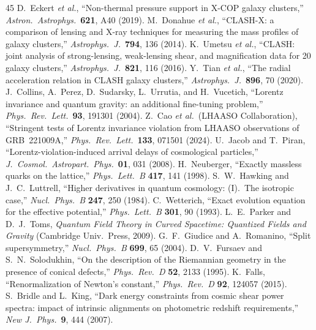 \documentclass[11pt,a4paper]{article}
\begin{document}
\begin{thebibliography}{45}
 D.~Eckert \textit{et al.}, ``Non-thermal pressure support in X-COP galaxy clusters,'' \textit{Astron.\ Astrophys.}\ \textbf{621}, A40 (2019).
 M.~Donahue \textit{et al.}, ``CLASH-X: a comparison of lensing and X-ray techniques for measuring the mass profiles of galaxy clusters,'' \textit{Astrophys.\ J.}\ \textbf{794}, 136 (2014).
 K.~Umetsu \textit{et al.}, ``CLASH: joint analysis of strong-lensing, weak-lensing shear, and magnification data for 20 galaxy clusters,'' \textit{Astrophys.\ J.}\ \textbf{821}, 116 (2016).
 Y.~Tian \textit{et al.}, ``The radial acceleration relation in CLASH galaxy clusters,'' \textit{Astrophys.\ J.}\ \textbf{896}, 70 (2020).
 J.~Collins, A.~Perez, D.~Sudarsky, L.~Urrutia, and H.~Vucetich, ``Lorentz invariance and quantum gravity: an additional fine-tuning problem,'' \textit{Phys.\ Rev.\ Lett.}\ \textbf{93}, 191301 (2004).
 Z.~Cao \textit{et al.}\ (LHAASO Collaboration), ``Stringent tests of Lorentz invariance violation from LHAASO observations of GRB~221009A,'' \textit{Phys.\ Rev.\ Lett.}\ \textbf{133}, 071501 (2024).
 U.~Jacob and T.~Piran, ``Lorentz-violation-induced arrival delays of cosmological particles,'' \textit{J.\ Cosmol.\ Astropart.\ Phys.}\ \textbf{01}, 031 (2008).
 H.~Neuberger, ``Exactly massless quarks on the lattice,'' \textit{Phys.\ Lett.\ B} \textbf{417}, 141 (1998).
 S.~W.~Hawking and J.~C.~Luttrell, ``Higher derivatives in quantum cosmology: (I).\ The isotropic case,'' \textit{Nucl.\ Phys.\ B} \textbf{247}, 250 (1984).
 C.~Wetterich, ``Exact evolution equation for the effective potential,'' \textit{Phys.\ Lett.\ B} \textbf{301}, 90 (1993).
 L.~E.~Parker and D.~J.~Toms, \textit{Quantum Field Theory in Curved Spacetime: Quantized Fields and Gravity} (Cambridge Univ.\ Press, 2009).
 G.~F.~Giudice and A.~Romanino, ``Split supersymmetry,'' \textit{Nucl.\ Phys.\ B} \textbf{699}, 65 (2004).
 D.~V.~Fursaev and S.~N.~Solodukhin, ``On the description of the Riemannian geometry in the presence of conical defects,'' \textit{Phys.\ Rev.\ D} \textbf{52}, 2133 (1995).
 K.~Falls, ``Renormalization of Newton's constant,'' \textit{Phys.\ Rev.\ D} \textbf{92}, 124057 (2015).
 S.~Bridle and L.~King, ``Dark energy constraints from cosmic shear power spectra: impact of intrinsic alignments on photometric redshift requirements,'' \textit{New J.\ Phys.}\ \textbf{9}, 444 (2007).

\end{thebibliography}
\end{document}
